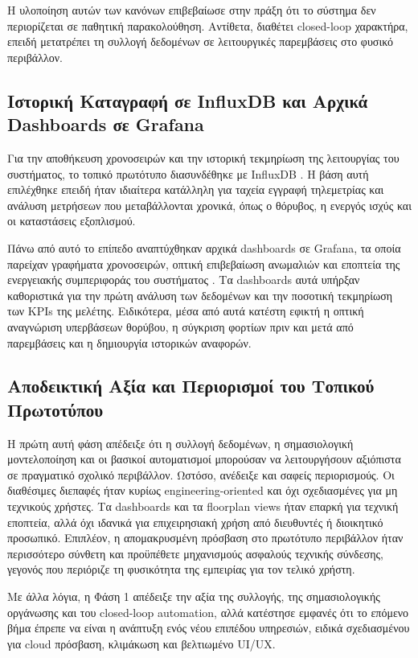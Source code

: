 Η υλοποίηση αυτών των κανόνων επιβεβαίωσε στην πράξη ότι το σύστημα δεν περιορίζεται σε παθητική παρακολούθηση. Αντίθετα, διαθέτει \textlatin{closed-loop} χαρακτήρα, επειδή μετατρέπει τη συλλογή δεδομένων σε λειτουργικές παρεμβάσεις στο φυσικό περιβάλλον.

\subsection{Ιστορική Καταγραφή σε InfluxDB και Αρχικά Dashboards σε Grafana}
Για την αποθήκευση χρονοσειρών και την ιστορική τεκμηρίωση της λειτουργίας του συστήματος, το τοπικό πρωτότυπο διασυνδέθηκε με \textlatin{InfluxDB} \cite{InfluxDB_docs}. Η βάση αυτή επιλέχθηκε επειδή ήταν ιδιαίτερα κατάλληλη για ταχεία εγγραφή τηλεμετρίας και ανάλυση μετρήσεων που μεταβάλλονται χρονικά, όπως ο θόρυβος, η ενεργός ισχύς και οι καταστάσεις εξοπλισμού.

Πάνω από αυτό το επίπεδο αναπτύχθηκαν αρχικά \textlatin{dashboards} σε \textlatin{Grafana}, τα οποία παρείχαν γραφήματα χρονοσειρών, οπτική επιβεβαίωση ανωμαλιών και εποπτεία της ενεργειακής συμπεριφοράς του συστήματος \cite{Grafana_docs}. Τα \textlatin{dashboards} αυτά υπήρξαν καθοριστικά για την πρώτη ανάλυση των δεδομένων και την ποσοτική τεκμηρίωση των \textlatin{KPIs} της μελέτης. Ειδικότερα, μέσα από αυτά κατέστη εφικτή η οπτική αναγνώριση υπερβάσεων θορύβου, η σύγκριση φορτίων πριν και μετά από παρεμβάσεις και η δημιουργία ιστορικών αναφορών.

\subsection{Αποδεικτική Αξία και Περιορισμοί του Τοπικού Πρωτοτύπου}
Η πρώτη αυτή φάση απέδειξε ότι η συλλογή δεδομένων, η σημασιολογική μοντελοποίηση και οι βασικοί αυτοματισμοί μπορούσαν να λειτουργήσουν αξιόπιστα σε πραγματικό σχολικό περιβάλλον. Ωστόσο, ανέδειξε και σαφείς περιορισμούς. Οι διαθέσιμες διεπαφές ήταν κυρίως \textlatin{engineering-oriented} και όχι σχεδιασμένες για μη τεχνικούς χρήστες. Τα \textlatin{dashboards} και τα \textlatin{floorplan views} ήταν επαρκή για τεχνική εποπτεία, αλλά όχι ιδανικά για επιχειρησιακή χρήση από διευθυντές ή διοικητικό προσωπικό. Επιπλέον, η απομακρυσμένη πρόσβαση στο πρωτότυπο περιβάλλον ήταν περισσότερο σύνθετη και προϋπέθετε μηχανισμούς ασφαλούς τεχνικής σύνδεσης, γεγονός που περιόριζε τη φυσικότητα της εμπειρίας για τον τελικό χρήστη.

Με άλλα λόγια, η Φάση 1 απέδειξε την αξία της συλλογής, της σημασιολογικής οργάνωσης και του \textlatin{closed-loop automation}, αλλά κατέστησε εμφανές ότι το επόμενο βήμα έπρεπε να είναι η ανάπτυξη ενός νέου επιπέδου υπηρεσιών, ειδικά σχεδιασμένου για \textlatin{cloud} πρόσβαση, κλιμάκωση και βελτιωμένο \textlatin{UI/UX}.

